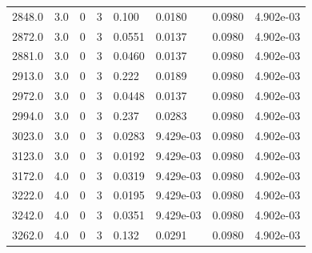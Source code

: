 \documentclass[preview]{standalone}
\begin{document}
{{{{{\begin{tabular}{L{1.2cm}C{1.2cm} C{0.3cm}C{0.5cm} C{1.4cm}C{1.4cm} C{1.4cm}C{1.4cm}}
  2848.0  &   3.0  & 0     &  3 &  0.100  & 0.0180  & 0.0980 &  4.902e-03   \\ 
  2872.0  &   3.0  & 0     &  3 &  0.0551  & 0.0137  & 0.0980 &  4.902e-03   \\ 
  2881.0  &   3.0  & 0     &  3 &  0.0460  & 0.0137  & 0.0980 &  4.902e-03   \\ 
  2913.0  &   3.0  & 0     &  3 &  0.222  & 0.0189  & 0.0980 &  4.902e-03   \\ 
  2972.0  &   3.0  & 0     &  3 &  0.0448  & 0.0137  & 0.0980 &  4.902e-03   \\ 
  2994.0  &   3.0  & 0     &  3 &  0.237  & 0.0283  & 0.0980 &  4.902e-03   \\ 
  3023.0  &   3.0  & 0     &  3 &  0.0283  & 9.429e-03  & 0.0980 &  4.902e-03   \\ 
  3123.0  &   3.0  & 0     &  3 &  0.0192  & 9.429e-03  & 0.0980 &  4.902e-03   \\ 
  3172.0  &   4.0  & 0     &  3 &  0.0319  & 9.429e-03  & 0.0980 &  4.902e-03   \\ 
  3222.0  &   4.0  & 0     &  3 &  0.0195  & 9.429e-03  & 0.0980 &  4.902e-03   \\ 
  3242.0  &   4.0  & 0     &  3 &  0.0351  & 9.429e-03  & 0.0980 &  4.902e-03   \\ 
  3262.0  &   4.0  & 0     &  3 &  0.132  & 0.0291  & 0.0980 &  4.902e-03   \\ 
\hline 
\end{tabular} 

}}}}}
\end{document}
